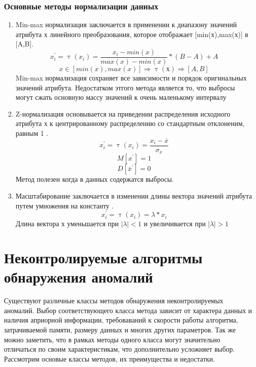 \subsubsection{Основные методы нормализации данных}
\begin{enumerate}
	\item Min-max нормализация заключается в применении к диапазону значений атрибута х линейного преобразования, которое отображает [min(х),max(х)] в [A,B].
	\begin{equation}
	x^\prime_i=\uptau(x_i)=\frac{x_i - min(x)}{max(x) - min(x)}*(B-A) + A
		\end{equation}
   \begin{equation}
		x \in[min(x), max(x)] \Rightarrow \uptau(х) \Rightarrow [A,B]
	\end{equation}
	Min-max нормализация сохраняет все зависимости и порядок оригинальных значений атрибута. Недостатком этгого метода является то, что выбросы могут сжать основную массу значений к очень маленькому интервалу
	\item Z-нормализация  основывается на приведении распределения исходного атрибута х  к центрированному распределению со стандартным отклоненим, равным 1 \cite{Book06} .
	\begin{equation}
	x^\prime_i=\uptau(x_i) =\frac{x_i - \overline{x}}{\sigma_x}
		\end{equation}
		\begin{equation}
		M[x^\prime]=1	 
		\end{equation}
		\begin{equation}
		D[\overline{x}^\prime]=0	 
		\end{equation}
		Метод полезен когда в данных содержатся выбросы.
	\item Масштабирование заключается в изменении длины вектора значений атрибута путем умножения на константу \cite{Book06} .
	\begin{equation}
	x^\prime_i=\uptau(x_i)=\lambda*x_i
	\end{equation}
	Длина вектора х уменьшается при $|\lambda|<1$ и увеличивается при $|\lambda|>1$ 
\end{enumerate}
\section{Неконтролируемые алгоритмы обнаружения аномалий}
Существуют различные классы методов обнаружения неконтролируемых аномалий. Выбор соответствующего класса метода зависит от характера данных и наличия априорной информации, требоваваний к скорости работы алгоритма, затрачиваемой памяти, размеру данных и многих других параметров. Так же можно заметить, что в рамках методы одного класса могут значительно отличаться по своим характеристикам, что дополнительно усложняет выбор. Рассмотрим основые классы методов, их преимущества и недостатки. 
